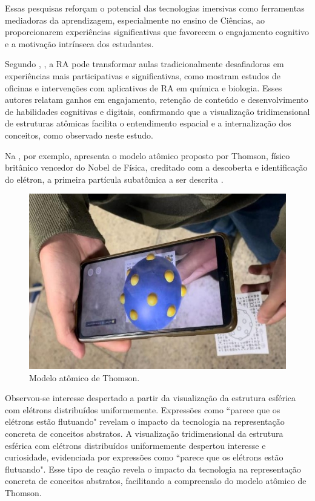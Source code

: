 \documentclass[portuguese]{textolivre}
\begin{document}
Essas pesquisas reforçam o potencial das tecnologias imersivas como ferramentas mediadoras da aprendizagem, especialmente no ensino de Ciências, ao proporcionarem experiências significativas que favorecem o engajamento cognitivo e a motivação intrínseca dos estudantes.

Segundo \textcite{santos2023}, \textcite{tito2022}, a RA pode transformar aulas tradicionalmente desafiadoras em experiências mais participativas e significativas, como mostram estudos de oficinas e intervenções com aplicativos de RA em química e biologia. Esses autores relatam ganhos em engajamento, retenção de conteúdo e desenvolvimento de habilidades cognitivas e digitais, confirmando que a visualização tridimensional de estruturas atômicas facilita o entendimento espacial e a internalização dos conceitos, como observado neste estudo.

Na , por exemplo, apresenta o modelo atômico proposto por Thomson, físico britânico vencedor do Nobel de Física, creditado com a descoberta e identificação do elétron, a primeira partícula subatômica a ser descrita \cite{oliveira2021}.

\begin{figure}[htbp]
\centering
\begin{minipage}{0.65\textwidth}
\includegraphics[angle=90,width =\textwidth]{Imagens/Fig2.jpg}
\caption{Modelo atômico de Thomson.}
\label{fig-2}
\end{minipage}
\end{figure}

Observou-se interesse despertado a partir da visualização da estrutura esférica com elétrons distribuídos uniformemente. Expressões como ``parece que os elétrons estão flutuando" revelam o impacto da tecnologia na representação concreta de conceitos abstratos. A visualização tridimensional da estrutura esférica com elétrons distribuídos uniformemente despertou interesse e curiosidade, evidenciada por expressões como ``parece que os elétrons estão flutuando". Esse tipo de reação revela o impacto da tecnologia na representação concreta de conceitos abstratos, facilitando a compreensão do modelo atômico de Thomson.
\end{document}

